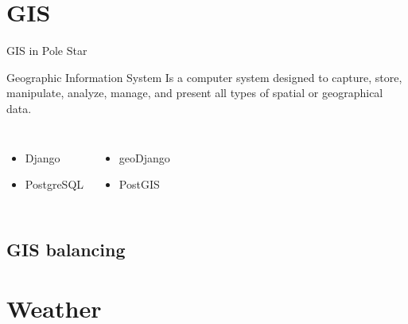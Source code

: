 \documentclass[xcolor=svgnames]{beamer}
\begin{document}
\section{GIS}

    \begin{frame}{GIS in Pole Star}
        \begin{center}
            \color{black}
            \begin{block}{Geographic Information System}
                Is a computer system designed to capture, store, manipulate, analyze, manage, and present all types of spatial or geographical data.
            \end{block}
        \end{center}
        \vspace{0.05\textheight}
        \begin{columns}[c]
                \begin{itemize}
                    \item<2-> Django
                    \item<3-> PostgreSQL
                \end{itemize}
                \begin{itemize}
                    \item<2-> geoDjango
                    \item<3-> PostGIS
                \end{itemize}
        \end{columns}
    \end{frame}

   \subsection{GIS balancing}



        \begin{frame}
        \end{frame}

\section{Weather}
\end{document}
